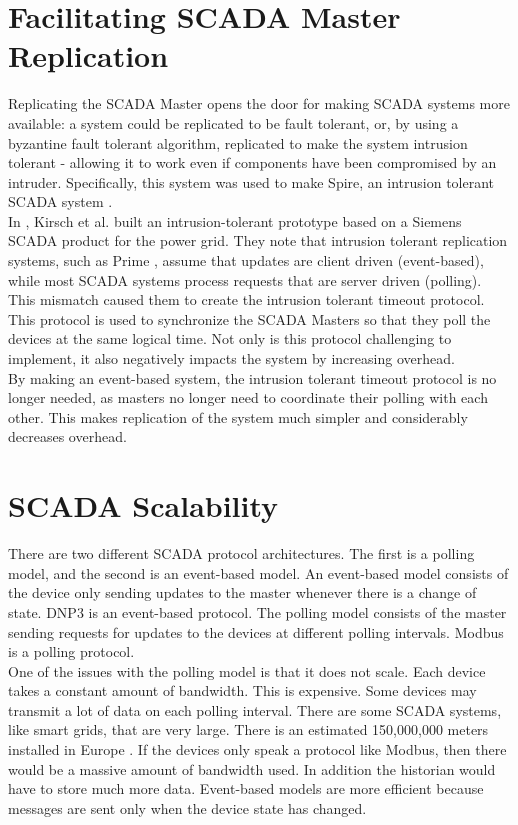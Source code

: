 \documentclass[oneside,11pt,a4paper,oldfontcommands]{book}
\begin{document}
\section{Facilitating SCADA Master Replication}

\indent \indent
Replicating the SCADA Master opens the door for making SCADA systems more available:
a system could be replicated to be fault tolerant,
or, by using a byzantine fault tolerant algorithm, replicated to make the system intrusion tolerant -
allowing it to work even if components have been compromised by an intruder.
Specifically, this system was used to make Spire, an intrusion tolerant SCADA
system \cite{Spire}. \\

\indent 
In \cite{SurvivableSCADA}, Kirsch et al. built an intrusion-tolerant prototype 
based on a Siemens SCADA product for the power grid. They note that 
intrusion tolerant replication systems, such as Prime \cite{Prime}, assume that updates are 
client driven (event-based), while most SCADA systems process requests that are
server driven (polling). This mismatch caused them to create the intrusion tolerant timeout
protocol. This protocol is used to synchronize the SCADA Masters so that they poll the devices at the
same logical time. Not only is this protocol challenging to implement, it also negatively
impacts the system by increasing overhead. \\

\indent
By making an event-based system, the intrusion tolerant timeout protocol is no
longer needed, as masters no longer need to coordinate their polling with
each other. This makes replication
of the system much simpler and considerably decreases overhead.\\

\section{SCADA Scalability}

\indent \indent
There are two different SCADA protocol architectures. The first is a polling model, and
the second is an event-based model. An event-based model consists of the device only
sending updates to the master whenever there is a change of state. DNP3 is an
event-based protocol. The polling
model consists of the master sending requests for updates to the devices
at different polling intervals. Modbus is a polling protocol.\\

\indent
One of the issues with the polling model is that it does not scale. Each device
takes a constant amount of bandwidth. This is expensive. Some devices may transmit
a lot of data on each polling interval. There are some SCADA systems, like smart
grids, that are very large. There is an estimated 150,000,000 meters installed in Europe
\cite{EventMeters}. If the devices only
speak a protocol like Modbus, then there would be a massive amount of bandwidth
used. In addition the historian would have to store much more data. Event-based
models are more efficient because messages are sent only when the device state
has changed.\\
\end{document}
